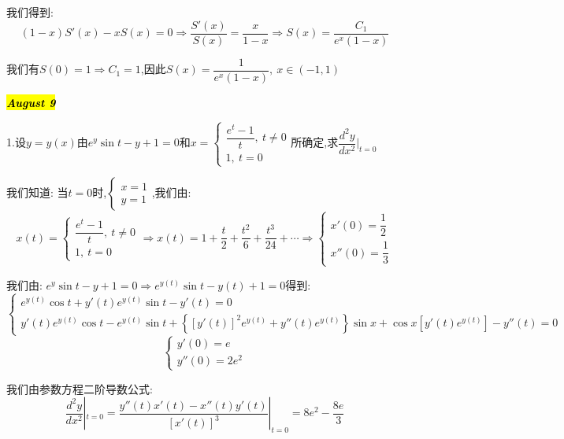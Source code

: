 \begin{solution}
	我们得到:  
	$$(1-x)S'(x)-xS(x)=0\Rightarrow \dfrac{S'(x)}{S(x)}=\dfrac{x}{1-x}\Rightarrow S(x)=\dfrac{C_{1}}{e^x(1-x)}$$
	
	我们有$S(0)=1\Rightarrow C_{1}=1$,因此$S(x)=\dfrac{1}{e^x(1-x)},\ x\in(-1,1)$
	
\end{solution}

\hl{\textbf{\textit{August 9}}}

1.设$y=y(x)$由$e^y\sin t-y+1=0$和$x=\left\lbrace
\begin{array}{l}
	\dfrac{e^t-1}{t},\ t\neq 0\\
	1,\ t=0
\end{array}
\right. $所确定,求$\dfrac{d^2y}{dx^2}|_{t=0}$
\begin{solution}

	我们知道:  当$t=0$时,$\left\lbrace
	\begin{array}{l}
		x=1\\y=1
	\end{array}
	\right. $,我们由:  
	$$x(t)=\left\lbrace
	\begin{array}{l}
		\dfrac{e^t-1}{t},\ t\neq 0\\
		1,\ t=0
	\end{array}
	\right. \Rightarrow x(t)=1+\dfrac{t}{2}+\dfrac{t^2}{6}+\dfrac{t^3}{24}+\cdots\Rightarrow \left\lbrace
	\begin{array}{l}
		x'(0)=\dfrac{1}{2}\\
		x''(0)=\dfrac{1}{3}
	\end{array}
	\right. $$
	
	我们由:  $e^y\sin t-y+1=0\Rightarrow e^{y(t)}\sin t-y(t)+1=0$得到:  
	$$\left\lbrace
	\begin{array}{l}
		e^{y(t)}\cos t+y'(t)e^{y(t)}\sin t-y'(t)=0\\
		y'(t)e^{y(t)}\cos t-e^{y(t)}\sin t+\left\lbrace [y'(t)]^2e^{y(t)}+y''(t)e^{y(t)}\right\rbrace \sin x+\cos x\left[y'(t)e^{y(t)} \right]-y''(t)=0
	\end{array}
	\right.$$
	$$\left\lbrace
	\begin{array}{l}
		y'(0)=e\\
		y''(0)=2e^2
	\end{array}
	\right. $$
	
	我们由参数方程二阶导数公式:  
	$$\dfrac{d^2y}{dx^2}|_{t=0}=\dfrac{y''(t)x'(t)-x''(t)y'(t)}{[x'(t)]^3}|_{t=0}=8e^2-\dfrac{8e}{3}$$
	
\end{solution}

